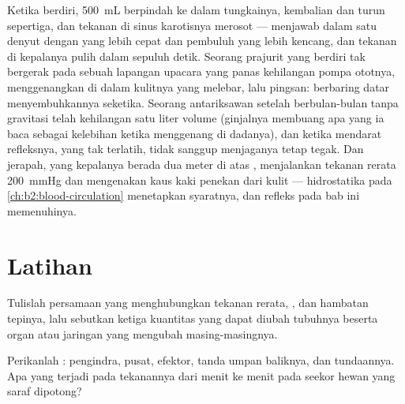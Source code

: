 \begin{example}\label{ex:b2:blood-pressure:standing}
Ketika berdiri, \qty{500}{mL}  berpindah ke dalam  tungkainya,
kembalian  dan  turun sepertiga, dan tekanan di
sinus karotisnya merosot ---  menjawab dalam satu denyut
dengan  yang lebih cepat dan pembuluh yang lebih kencang, dan
tekanan di kepalanya pulih dalam sepuluh detik. Seorang prajurit yang
berdiri tak bergerak pada sebuah lapangan upacara yang panas kehilangan
pompa ototnya, menggenangkan  di dalam  kulitnya yang melebar,
lalu pingsan: berbaring datar menyembuhkannya seketika. Seorang
antariksawan setelah berbulan-bulan tanpa gravitasi telah kehilangan
satu liter volume  (ginjalnya membuang apa yang ia baca sebagai
kelebihan ketika  menggenang di dadanya), dan ketika mendarat
refleksnya, yang tak terlatih, tidak sanggup menjaganya tetap tegak.
Dan jerapah, yang kepalanya berada dua meter di atas ,
menjalankan tekanan rerata \qty{200}{mmHg} dan mengenakan kaus kaki
penekan dari kulit --- hidrostatika pada
\cref{ch:b2:blood-circulation} menetapkan syaratnya, dan refleks pada
bab ini memenuhinya.
\end{example}

\section{Latihan}

\begin{exercise}[$\star$]\label{exo:b2:blood-pressure:1}
Tulislah persamaan yang menghubungkan tekanan rerata, ,
dan hambatan tepinya, lalu sebutkan ketiga kuantitas yang dapat diubah
tubuhnya beserta organ atau jaringan yang mengubah masing-masingnya.
\end{exercise}

\begin{exercise}[$\star$]\label{exo:b2:blood-pressure:2}
Perikanlah : pengindra, pusat, efektor, tanda umpan
baliknya, dan tundaannya. Apa yang terjadi pada tekanannya dari menit
ke menit pada seekor hewan yang saraf  dipotong?
\end{exercise}

